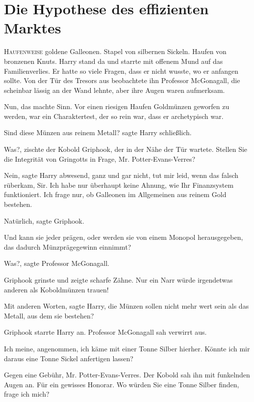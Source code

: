 \chapter{Die Hypothese des effizienten Marktes}

\lettrine{H}{aufenweise} goldene Galleonen. Stapel von silbernen Sickeln. Haufen
von bronzenen Knuts. Harry stand da und starrte mit offenem Mund auf das
Familienverlies. Er hatte so viele Fragen, dass er nicht wusste, wo er anfangen
sollte. Von der Tür des Tresors aus beobachtete ihn Professor McGonagall, die
scheinbar lässig an der Wand lehnte, aber ihre Augen waren aufmerksam.

Nun, das machte Sinn. Vor einen riesigen Haufen Goldmünzen geworfen zu werden,
war ein Charaktertest, der so rein war, dass er archetypisch war.

\glqq{}Sind diese Münzen aus reinem Metall?\grqq{} sagte Harry schließlich.

\glqq{}Was?\grqq{}, zischte der Kobold Griphook, der in der Nähe der Tür wartete.
\glqq{}Stellen Sie die Integrität von Gringotts in Frage, Mr.
Potter-Evans-Verres?\grqq{}

\glqq{}Nein\grqq{}, sagte Harry abwesend, \glqq{}ganz und gar nicht, tut mir leid,
wenn das falsch rüberkam, Sir. Ich habe nur überhaupt keine Ahnung, wie Ihr
Finanzsystem funktioniert. Ich frage nur, ob Galleonen im Allgemeinen aus reinem
Gold bestehen.\grqq{}

\glqq{}Natürlich\grqq{}, sagte Griphook.

\glqq{}Und kann sie jeder prägen, oder werden sie von einem Monopol
herausgegeben, das dadurch Münzprägegewinn einnimmt?\grqq{}

\glqq{}Was?\grqq{}, sagte Professor McGonagall.

Griphook grinste und zeigte scharfe Zähne. \glqq{}Nur ein Narr würde irgendetwas
anderen als Koboldmünzen trauen!\grqq{}

\glqq{}Mit anderen Worten\grqq{}, sagte Harry, \glqq{}die Münzen sollen nicht mehr
wert sein als das Metall, aus dem sie bestehen?\grqq{}

Griphook starrte Harry an. Professor McGonagall sah verwirrt aus.

\glqq{}Ich meine, angenommen, ich käme mit einer Tonne Silber hierher. Könnte ich
mir daraus eine Tonne Sickel anfertigen lassen?\grqq{}

\glqq{}Gegen eine Gebühr, Mr. Potter-Evans-Verres.\grqq{} Der Kobold sah ihn mit
funkelnden Augen an. \glqq{}Für ein gewisses Honorar. Wo würden Sie eine Tonne
Silber finden, frage ich mich?\grqq{}

